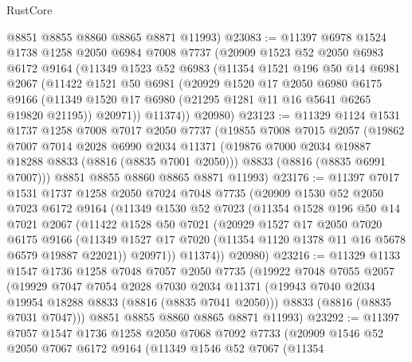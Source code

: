 \begin{lexlean}{RustCore}
\begin{coremodule}
      @8851
      @8855
      @8860
      @8865
      @8871
      @11993)
@23083 := @11397
    @6978
    @1524
    @1738
    @1258
    @2050
    @6984
    @7008
    @7737
    (@20909
      @1523
      @52
      @2050
      @6983
      @6172
      @9164
      (@11349
        @1523
        @52
        @6983
        (@11354
          @1521
          @196
          @50
          @14
          @6981
          @2067
          (@11422
            @1521
            @50
            @6981
            (@20929
              @1520
              @17
              @2050
              @6980
              @6175
              @9166
              (@11349 @1520 @17 @6980 (@21295 @1281 @11 @16 @5641 @6265 @19820 @21195))
              @20971))
          @11374))
      @20980)
@23123 := @11329
    @1124
    @1531
    @1737
    @1258
    @7008
    @7017
    @2050
    @7737
    (@19855
      @7008
      @7015
      @2057
      (@19862
        @7007
        @7014
        @2028
        @6990
        @2034
        @11371
        (@19876 @7000 @2034 @19887 @18288 @8833 (@8816 (@8835 @7001 @2050)))
        @8833
        (@8816 (@8835 @6991 @7007)))
      @8851
      @8855
      @8860
      @8865
      @8871
      @11993)
@23176 := @11397
    @7017
    @1531
    @1737
    @1258
    @2050
    @7024
    @7048
    @7735
    (@20909
      @1530
      @52
      @2050
      @7023
      @6172
      @9164
      (@11349
        @1530
        @52
        @7023
        (@11354
          @1528
          @196
          @50
          @14
          @7021
          @2067
          (@11422
            @1528
            @50
            @7021
            (@20929
              @1527
              @17
              @2050
              @7020
              @6175
              @9166
              (@11349 @1527 @17 @7020 (@11354 @1120 @1378 @11 @16 @5678 @6579 @19887 @22021))
              @20971))
          @11374))
      @20980)
@23216 := @11329
    @1133
    @1547
    @1736
    @1258
    @7048
    @7057
    @2050
    @7735
    (@19922
      @7048
      @7055
      @2057
      (@19929
        @7047
        @7054
        @2028
        @7030
        @2034
        @11371
        (@19943 @7040 @2034 @19954 @18288 @8833 (@8816 (@8835 @7041 @2050)))
        @8833
        (@8816 (@8835 @7031 @7047)))
      @8851
      @8855
      @8860
      @8865
      @8871
      @11993)
@23292 := @11397
    @7057
    @1547
    @1736
    @1258
    @2050
    @7068
    @7092
    @7733
    (@20909
      @1546
      @52
      @2050
      @7067
      @6172
      @9164
      (@11349
        @1546
        @52
        @7067
        (@11354

\end{coremodule}
\end{lexlean}
